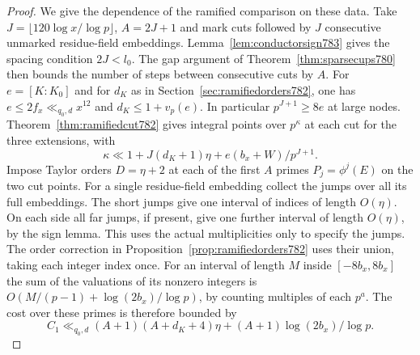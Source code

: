 \documentclass[a4paper,11pt]{article}
\theoremstyle{definition}
\theoremstyle{remark}
\numberwithin{equation}{section}
\begin{document}
\begin{proof}
We give the dependence of the ramified comparison on these
data. Take \(J=\lfloor120\log x/\log p\rfloor\), \(A=2J+1\)
and mark cuts followed by \(J\) consecutive unmarked
residue-field embeddings. Lemma~\ref{lem:conductorsign783}
gives the spacing condition \(2J<l_0\). The gap argument of
Theorem~\ref{thm:sparsecups780} then bounds the number of
steps between consecutive cuts by \(A\).
For \(e=[K:K_0]\) and for \(d_K\) as in
Section~\ref{sec:ramifiedorders782}, one has
\(e\le 2 f_x\ll_{q_0,d} x^{12}\) and \(d_K\le 1+v_p(e)\).
In particular \(p^{J+1}\ge 8e\) at large nodes.
Theorem~\ref{thm:ramifiedcut782} gives integral points over
\(p^\kappa\) at each cut for the three extensions, with
\[
    \kappa\ll 1+J(d_K+1)\eta+e(b_x+W)/p^{J+1}.
\]
Impose Taylor orders \(D=\eta+2\) at each of the first
\(A\) primes \(P_j=\phi^j(E)\) on the two cut points.
For a single residue-field embedding collect the jumps
over all its full embeddings. The short jumps give one
interval of indices of length \(O(\eta)\). On each side
all far jumps, if present, give one further interval
of length \(O(\eta)\), by the sign lemma. This uses the
actual multiplicities only to specify the jumps. The order
correction in Proposition~\ref{prop:ramifiedorders782}
uses their union, taking each integer index once.
For an interval of length \(M\) inside \([-8b_x,8b_x]\)
the sum of the valuations of its nonzero integers is
\(O(M/(p-1)+\log(2b_x)/\log p)\), by counting multiples
of each \(p^a\). The cost over these primes is therefore
bounded by
\[
    C_1\ll_{q_0,d}(A+1)(A+d_K+4)\eta
                        +(A+1)\log(2b_x)/\log p .
\]


\end{proof}
\end{document}
